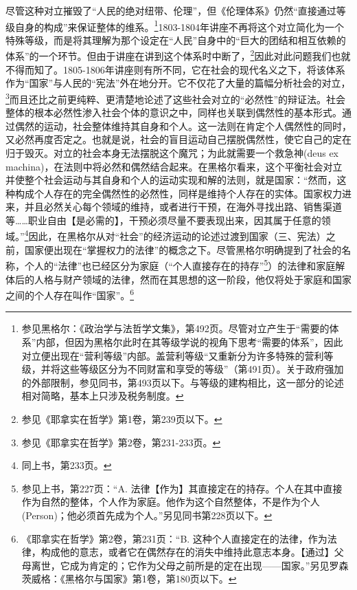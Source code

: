 尽管这种对立摧毁了“人民的绝对纽带、伦理”，但《伦理体系》仍然“直接通过等级自身的构成”来保证整体的维系。\footnote{参见黑格尔：《政治学与法哲学文集》，第492页。尽管对立产生于“需要的体系”内部，但因为黑格尔此时在其等级学说的视角下思考“需要的体系”，因此对立便出现在“营利等级”内部。盖营利等级“又重新分为许多特殊的营利等级，并将这些等级区分为不同财富和享受的等级”（第491页）。关于政府强加的外部限制，参见同书，第493页以下。与等级的建构相比，这一部分的论述相对简略，基本上只涉及税务制度。}1803-1804年讲座不再将这个对立简化为一个特殊等级，而是将其理解为那个设定在“人民”自身中的“巨大的团结和相互依赖的体系”的一个环节。但由于讲座在讲到这个体系时中断了，\footnote{参见《耶拿实在哲学》第1卷，第239页以下。}因此对此问题我们也就不得而知了。1805-1806年讲座则有所不同，它在社会的现代名义之下，将该体系作为“国家”与人民的“宪法”外在地分开。它不仅花了大量的篇幅分析社会的对立，\footnote{参见《耶拿实在哲学》第2卷，第231-233页。}而且还比之前更纯粹、更清楚地论述了这些社会对立的“必然性”的辩证法。社会整体的根本必然性渗入社会个体的意识之中，同样也关联到偶然性的基本形式。通过偶然的运动，社会整体维持其自身和个人。这一法则在肯定个人偶然性的同时，又必然再度否定之。也就是说，社会的盲目运动自己摆脱偶然性，使它自己的定在归于毁灭。对立的社会本身无法摆脱这个魔咒；为此就需要一个救急神(deus ex machina)，在法则中将必然和偶然结合起来。在黑格尔看来，这个平衡社会对立并使整个社会运动与其自身和个人的运动实现和解的法则，就是国家：“然而，这种构成个人存在的完全偶然性的必然性，同样是维持个人存在的实体。国家权力进来，并且必然关心每个领域的维持，或者进行干预，在海外寻找出路、销售渠道等……职业自由【是必需的】，干预必须尽量不要表现出来，因其属于任意的领域。”\footnote{同上书，第233页。}因此，在黑格尔从对“社会”的经济运动的论述过渡到国家（三、宪法）之前，国家便出现在“掌握权力的法律”的概念之下。尽管黑格尔明确提到了社会的名称，个人的“法律”也已经区分为家庭（“个人直接存在的持存”\footnote{参见上书，第227页：“A. 法律【作为】其直接定在的持存。个人在其中直接作为自然的整体，个人作为家庭。他作为这个自然整体，不是作为个人(Person)；他必须首先成为个人。”另见同书第228页以下。}）的法律和家庭解体后的人格与财产领域的法律，然而在其思想的这一阶段，他仅将处于家庭和国家之间的个人存在叫作“国家”。\footnote{《耶拿实在哲学》第2卷，第231页：“B. 这种个人直接定在的法律，作为法律，构成他的意志，或者它在偶然存在的消失中维持此意志本身。【通过】父母离世，它成为肯定的；它作为父母之前所是的定在出现——国家。”另见罗森茨威格：《黑格尔与国家》第1卷，第180页以下。}

